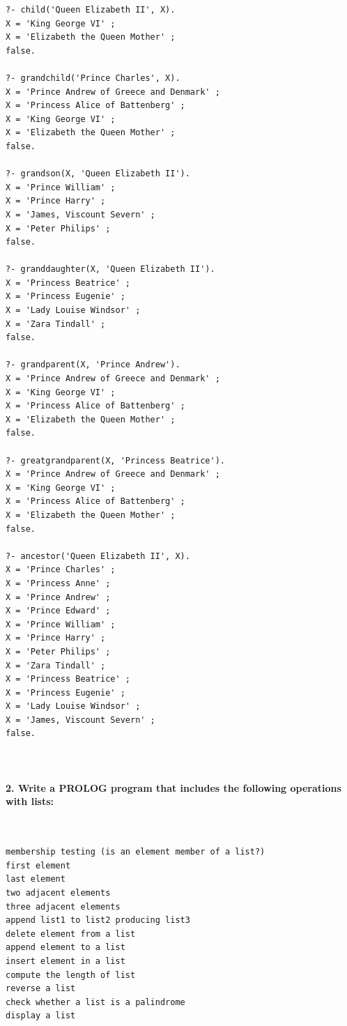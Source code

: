 \documentclass{article}
\begin{document}
\begin{verbatim}
?- child('Queen Elizabeth II', X).
X = 'King George VI' ;
X = 'Elizabeth the Queen Mother' ;
false.

?- grandchild('Prince Charles', X).
X = 'Prince Andrew of Greece and Denmark' ;
X = 'Princess Alice of Battenberg' ;
X = 'King George VI' ;
X = 'Elizabeth the Queen Mother' ;
false.

?- grandson(X, 'Queen Elizabeth II').
X = 'Prince William' ;
X = 'Prince Harry' ;
X = 'James, Viscount Severn' ;
X = 'Peter Philips' ;
false.

?- granddaughter(X, 'Queen Elizabeth II').
X = 'Princess Beatrice' ;
X = 'Princess Eugenie' ;
X = 'Lady Louise Windsor' ;
X = 'Zara Tindall' ;
false.

?- grandparent(X, 'Prince Andrew').
X = 'Prince Andrew of Greece and Denmark' ;
X = 'King George VI' ;
X = 'Princess Alice of Battenberg' ;
X = 'Elizabeth the Queen Mother' ;
false.

?- greatgrandparent(X, 'Princess Beatrice').
X = 'Prince Andrew of Greece and Denmark' ;
X = 'King George VI' ;
X = 'Princess Alice of Battenberg' ;
X = 'Elizabeth the Queen Mother' ;
false.

?- ancestor('Queen Elizabeth II', X).
X = 'Prince Charles' ;
X = 'Princess Anne' ;
X = 'Prince Andrew' ;
X = 'Prince Edward' ;
X = 'Prince William' ;
X = 'Prince Harry' ;
X = 'Peter Philips' ;
X = 'Zara Tindall' ;
X = 'Princess Beatrice' ;
X = 'Princess Eugenie' ;
X = 'Lady Louise Windsor' ;
X = 'James, Viscount Severn' ;
false.
		\end{verbatim}


\paragraph{}\
	
		
	\rmfamily
	
	\paragraph{2. Write a PROLOG program that includes the following operations with lists: }\
	
	\ttfamily
	
	\begin{lstlisting}
membership testing (is an element member of a list?)
first element
last element
two adjacent elements
three adjacent elements
append list1 to list2 producing list3
delete element from a list
append element to a list
insert element in a list
compute the length of list
reverse a list
check whether a list is a palindrome
display a list
	\end{lstlisting}
	
\end{document}
